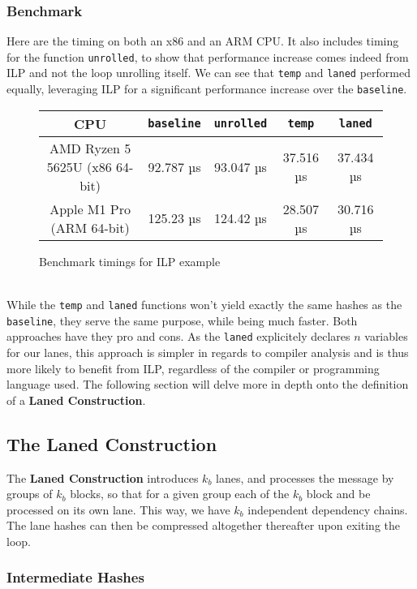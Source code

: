 \documentclass[10pt]{article}
\begin{document}
\clearpage
\subsubsection{Benchmark}
Here are the timing on both an x86 and an ARM CPU. It also includes timing for the function \texttt{unrolled},
to show that performance increase comes indeed from ILP and not the loop unrolling itself.
We can see that \texttt{temp} and \texttt{laned} performed equally, leveraging ILP for a significant performance increase over the \texttt{baseline}.
\\
\begin{figure}[ht]
\centering
\begin{tabular}{|c|c|c|c|c|}
\hline
CPU & \texttt{baseline} & \texttt{unrolled} & \texttt{temp} & \texttt{laned} \\
\hline
AMD Ryzen 5 5625U (x86 64-bit) & 92.787 µs & 93.047 µs & 37.516 µs & 37.434 µs \\
Apple M1 Pro (ARM 64-bit) & 125.23 µs & 124.42 µs & 28.507 µs & 30.716 µs \\
\hline
\end{tabular}
\caption{Benchmark timings for ILP example}
\label{tab:your_table_label}
\end{figure}
\\
While the \texttt{temp} and \texttt{laned} functions won't yield exactly the same hashes as the \texttt{baseline},
they serve the same purpose, while being much faster.
Both approaches have they pro and cons. As the \texttt{laned} explicitely declares \( n \) variables for our lanes,
this approach is simpler in regards to compiler analysis and is thus more likely to benefit from ILP,
regardless of the compiler or programming language used.
The following section will delve more in depth onto the definition of a \textbf{Laned Construction}.

\clearpage
\subsection{The Laned Construction}

The \textbf{Laned Construction} introduces \( k_b \) lanes, and processes the message by groups of \( k_b \) blocks,
so that for a given group each of the \( k_b \) block and be processed on its own lane.
This way, we have \( k_b \) independent dependency chains. The lane hashes can then be compressed altogether thereafter upon exiting the loop.

\subsubsection{Intermediate Hashes}
\end{document}
